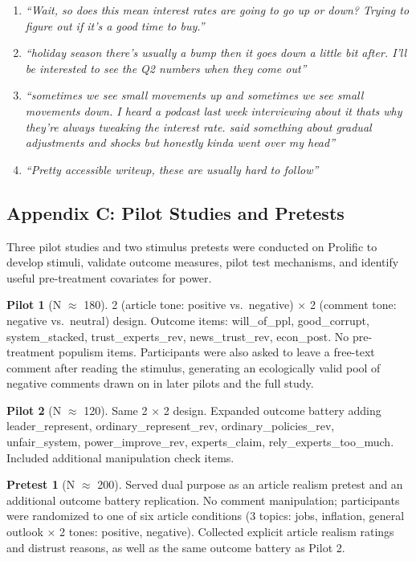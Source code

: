 \documentclass[
  12pt]{article}
\providecommand{\tightlist}{%
  \setlength{\itemsep}{0pt}\setlength{\parskip}{0pt}}
\begin{document}
\begin{enumerate}
\def\labelenumi{\arabic{enumi}.}
\tightlist
\item
  \emph{``Wait, so does this mean interest rates are going to go up or
  down? Trying to figure out if it's a good time to buy.''}
\item
  \emph{``holiday season there's usually a bump then it goes down a
  little bit after. I'll be interested to see the Q2 numbers when they
  come out''}
\item
  \emph{``sometimes we see small movements up and sometimes we see small
  movements down. I heard a podcast last week interviewing about it
  thats why they're always tweaking the interest rate. said something
  about gradual adjustments and shocks but honestly kinda went over my
  head''}
\item
  \emph{``Pretty accessible writeup, these are usually hard to follow''}
\end{enumerate}

\subsection{Appendix C: Pilot Studies and
Pretests}\label{appendix-c-pilot-studies-and-pretests}

Three pilot studies and two stimulus pretests were conducted on Prolific
to develop stimuli, validate outcome measures, pilot test mechanisms,
and identify useful pre-treatment covariates for power.

\textbf{Pilot 1} (N \(\approx\) 180). 2 (article tone: positive
vs.~negative) × 2 (comment tone: negative vs.~neutral) design. Outcome
items: will\_of\_ppl, good\_corrupt, system\_stacked,
trust\_experts\_rev, news\_trust\_rev, econ\_post. No pre-treatment
populism items. Participants were also asked to leave a free-text
comment after reading the stimulus, generating an ecologically valid
pool of negative comments drawn on in later pilots and the full study.

\textbf{Pilot 2} (N \(\approx\) 120). Same 2 × 2 design. Expanded
outcome battery adding leader\_represent, ordinary\_represent\_rev,
ordinary\_policies\_rev, unfair\_system, power\_improve\_rev,
experts\_claim, rely\_experts\_too\_much. Included additional
manipulation check items.

\textbf{Pretest 1} (N \(\approx\) 200). Served dual purpose as an
article realism pretest and an additional outcome battery replication.
No comment manipulation; participants were randomized to one of six
article conditions (3 topics: jobs, inflation, general outlook × 2
tones: positive, negative). Collected explicit article realism ratings
and distrust reasons, as well as the same outcome battery as Pilot 2.
\end{document}
